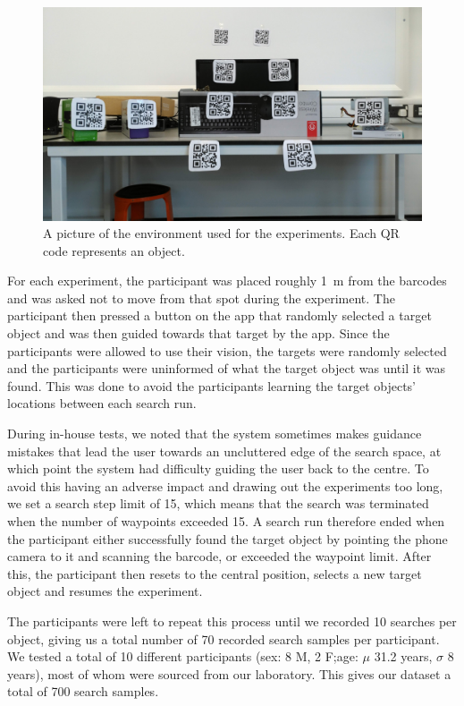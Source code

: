\documentclass[a4paper, twoside]{article}
\begin{document}
\begin{figure}
  \centering
  \includegraphics[width=\columnwidth]{../figures/test_env_picture.jpg}
  \caption{A picture of the environment used for the experiments. Each QR code represents an object.}\label{fig:env-picture}
\end{figure}

For each experiment, the participant was placed roughly \SI{1}{\meter} from the barcodes and was asked not to move from that spot during the experiment. The participant then pressed a button on the app that randomly selected a target object and was then guided towards that target by the app. Since the participants were allowed to use their vision, the targets were randomly selected and the participants were uninformed of what the target object was until it was found. This was done to avoid the participants learning the target objects' locations between each search run.

During in-house tests, we noted that the system sometimes makes guidance mistakes that lead the user towards an uncluttered edge of the search space, at which point the system had difficulty guiding the user back to the centre. To avoid this having an adverse impact and drawing out the experiments too long, we set a search step limit of 15, which means that the search was terminated when the number of waypoints exceeded 15. A search run therefore ended when the participant either successfully found the target object by pointing the phone camera to it and scanning the barcode, or exceeded the waypoint limit. After this, the participant then resets to the central position, selects a new target object and resumes the experiment.

The participants were left to repeat this process until we recorded 10 searches per object, giving us a total number of 70 recorded search samples per participant. We tested a total of 10 different participants (sex: 8 M, 2 F;\@ age: $\mu$ 31.2 years, $\sigma$ 8 years), most of whom were sourced from our laboratory. This gives our dataset a total of 700 search samples.
\end{document}
